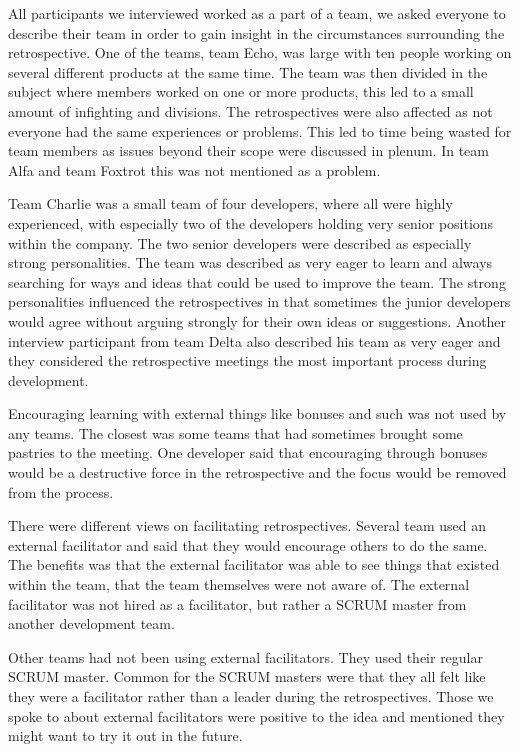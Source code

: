 \label{sub:general}

All participants we interviewed worked as a part of a team, we asked everyone to describe their team in order to gain insight in the circumstances surrounding the retrospective.  One of the teams, team Echo, was large with ten people working on several different products at the same time. The team was then divided in the subject where members worked on one or more products, this led to a small amount of infighting and divisions. The retrospectives were also affected as not everyone had the same experiences or problems. This led to time being wasted for team members as issues beyond their scope were discussed in plenum. In team Alfa and team Foxtrot this was not mentioned as a problem. 

Team Charlie was a small team of four developers, where all were highly experienced, with especially two of the developers holding very senior positions within the company. The two senior developers were described as especially strong personalities. The team was described as very eager to learn and always searching for ways and ideas that could be used to improve the team. The strong personalities influenced the retrospectives in that sometimes the junior developers would agree without arguing strongly for their own ideas or suggestions. Another interview participant from team Delta also described his team as very eager and they considered the retrospective meetings the most important process during development. 

\label{question-9}
Encouraging learning with external things like bonuses and such was not used by any teams. The closest was some teams that had sometimes brought some pastries to the meeting. One developer said that encouraging through bonuses would be a destructive force in the retrospective and the focus would be removed from the process.

\label{question-10}
There were different views on facilitating retrospectives. Several team used an external facilitator and said that they would encourage others to do the same. The benefits was that the external facilitator was able to see things that existed within the team, that the team themselves were not aware of. The external facilitator was not hired as a facilitator, but rather a SCRUM master from another development team.

Other teams had not been using external facilitators. They used their regular SCRUM master. Common for the SCRUM masters were that they all felt like they were a facilitator rather than a leader during the retrospectives. Those we spoke to about external facilitators were positive to the idea and mentioned they might want to try it out in the future. 

